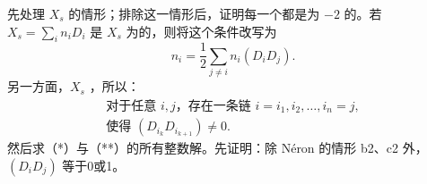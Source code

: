 先处理 $X_s$ 的情形；排除这一情形后，证明每一个都是为 $-2$ 的。若 $X_s=\sum_i n_iD_i$ 是 $X_s$ 为的，则将这个条件改写为
\begin{equation}n_i=\frac12\sum_{j\ne i}n_i(D_iD_j).\tag{*}\end{equation}
另一方面，$X_s$ ，所以：
\begin{equation}
\begin{gathered}
\text{对于任意 }i,j\text{，存在一条链 }i=i_1,i_2,\ldots,i_n=j,\\
\text{使得 }(D_{i_k}D_{i_{k+1}})\ne0.
\end{gathered}\tag{**}
\end{equation}
然后求（*）与（**）的所有整数解。先证明：除 Néron 的情形 b2、c2 外， $(D_iD_j)$ 等于0或1。
